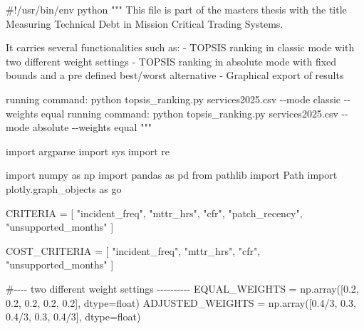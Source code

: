 \documentclass[
  12pt,
  letterpaper,
  12pt,
  oneside,
  english,
  onehalfspacing,
  headsepline]{MastersDoctoralThesis}
\newenvironment{Shaded}{\begin{snugshade}}{\end{snugshade}}
\newcommand{\BuiltInTok}[1]{\textcolor[rgb]{0.00,0.23,0.31}{#1}}
\newcommand{\CommentTok}[1]{\textcolor[rgb]{0.37,0.37,0.37}{#1}}
\newcommand{\DecValTok}[1]{\textcolor[rgb]{0.68,0.00,0.00}{#1}}
\newcommand{\FloatTok}[1]{\textcolor[rgb]{0.68,0.00,0.00}{#1}}
\newcommand{\ImportTok}[1]{\textcolor[rgb]{0.00,0.46,0.62}{#1}}
\newcommand{\NormalTok}[1]{\textcolor[rgb]{0.00,0.23,0.31}{#1}}
\newcommand{\OperatorTok}[1]{\textcolor[rgb]{0.37,0.37,0.37}{#1}}
\newcommand{\StringTok}[1]{\textcolor[rgb]{0.13,0.47,0.30}{#1}}
\begin{document}
\begin{Shaded}
\begin{Highlighting}[]
\CommentTok{\#!/usr/bin/env python}
\CommentTok{"""}
\CommentTok{This file is part of the master\textquotesingle{}s thesis with the title Measuring Technical Debt in Mission Critical Trading Systems.}

\CommentTok{It carries several functionalities such as:}
\CommentTok{{-} TOPSIS ranking in classic mode with two different weight settings}
\CommentTok{{-} TOPSIS ranking in absolute mode with fixed bounds and a pre defined best/worst alternative}
\CommentTok{{-} Graphical export of results}

\CommentTok{running command: python topsis\_ranking.py services2025.csv {-}{-}mode classic {-}{-}weights equal}
\CommentTok{running command: python topsis\_ranking.py services2025.csv {-}{-}mode absolute {-}{-}weights equal}
\CommentTok{"""}

\ImportTok{import}\NormalTok{ argparse}
\ImportTok{import}\NormalTok{ sys}
\ImportTok{import}\NormalTok{ re}

\ImportTok{import}\NormalTok{ numpy }\ImportTok{as}\NormalTok{ np}
\ImportTok{import}\NormalTok{ pandas }\ImportTok{as}\NormalTok{ pd}
\ImportTok{from}\NormalTok{ pathlib }\ImportTok{import}\NormalTok{ Path}
\ImportTok{import}\NormalTok{ plotly.graph\_objects }\ImportTok{as}\NormalTok{ go}

\NormalTok{CRITERIA }\OperatorTok{=}\NormalTok{ [}
    \StringTok{"incident\_freq"}\NormalTok{,}
    \StringTok{"mttr\_hrs"}\NormalTok{,}
    \StringTok{"cfr"}\NormalTok{,}
    \StringTok{"patch\_recency"}\NormalTok{,}
    \StringTok{"unsupported\_months"}
\NormalTok{]}

\NormalTok{COST\_CRITERIA }\OperatorTok{=}\NormalTok{ [}
    \StringTok{"incident\_freq"}\NormalTok{,}
    \StringTok{"mttr\_hrs"}\NormalTok{,}
    \StringTok{"cfr"}\NormalTok{,}
    \StringTok{"unsupported\_months"}
\NormalTok{]}

\CommentTok{\#{-}{-}{-}{-} two different weight settings {-}{-}{-}{-}{-}{-}{-}{-}{-}{-}}
\NormalTok{EQUAL\_WEIGHTS }\OperatorTok{=}\NormalTok{ np.array([}\FloatTok{0.2}\NormalTok{, }\FloatTok{0.2}\NormalTok{, }\FloatTok{0.2}\NormalTok{, }\FloatTok{0.2}\NormalTok{, }\FloatTok{0.2}\NormalTok{], dtype}\OperatorTok{=}\BuiltInTok{float}\NormalTok{)}
\NormalTok{ADJUSTED\_WEIGHTS }\OperatorTok{=}\NormalTok{ np.array([}\FloatTok{0.4}\OperatorTok{/}\DecValTok{3}\NormalTok{, }\FloatTok{0.3}\NormalTok{, }\FloatTok{0.4}\OperatorTok{/}\DecValTok{3}\NormalTok{, }\FloatTok{0.3}\NormalTok{, }\FloatTok{0.4}\OperatorTok{/}\DecValTok{3}\NormalTok{], dtype}\OperatorTok{=}\BuiltInTok{float}\NormalTok{)}


\end{Highlighting}
\end{Shaded}
\end{document}
